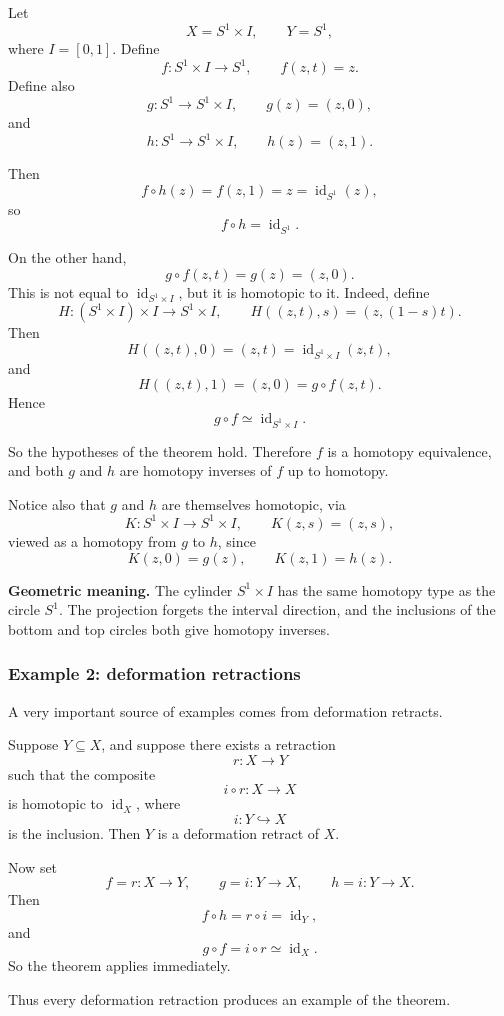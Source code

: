 \documentclass[12pt,a4paper]{article}
\theoremstyle{notespace}
\begin{document}
Let
\[
X=S^1\times I,
\qquad
Y=S^1,
\]
where \(I=[0,1]\). Define
\[
f:S^1\times I\to S^1,
\qquad
f(z,t)=z.
\]
Define also
\[
g:S^1\to S^1\times I,
\qquad
g(z)=(z,0),
\]
and
\[
h:S^1\to S^1\times I,
\qquad
h(z)=(z,1).
\]

Then
\[
f\circ h(z)=f(z,1)=z=\operatorname{id}_{S^1}(z),
\]
so
\[
f\circ h=\operatorname{id}_{S^1}.
\]

On the other hand,
\[
g\circ f(z,t)=g(z)=(z,0).
\]
This is not equal to \(\operatorname{id}_{S^1\times I}\), but it is homotopic to it. Indeed, define
\[
H:(S^1\times I)\times I\to S^1\times I,
\qquad
H((z,t),s)=(z,(1-s)t).
\]
Then
\[
H((z,t),0)=(z,t)=\operatorname{id}_{S^1\times I}(z,t),
\]
and
\[
H((z,t),1)=(z,0)=g\circ f(z,t).
\]
Hence
\[
g\circ f \simeq \operatorname{id}_{S^1\times I}.
\]

So the hypotheses of the theorem hold. Therefore \(f\) is a homotopy equivalence, and both \(g\) and \(h\) are homotopy inverses of \(f\) up to homotopy.

Notice also that \(g\) and \(h\) are themselves homotopic, via
\[
K:S^1\times I\to S^1\times I,
\qquad
K(z,s)=(z,s),
\]
viewed as a homotopy from \(g\) to \(h\), since
\[
K(z,0)=g(z),
\qquad
K(z,1)=h(z).
\]

\bigskip

\textbf{Geometric meaning.}
The cylinder \(S^1\times I\) has the same homotopy type as the circle \(S^1\). The projection forgets the interval direction, and the inclusions of the bottom and top circles both give homotopy inverses.

\subsubsection{Example 2: deformation retractions}

A very important source of examples comes from deformation retracts.

Suppose \(Y\subseteq X\), and suppose there exists a retraction
\[
r:X\to Y
\]
such that the composite
\[
i\circ r:X\to X
\]
is homotopic to \(\operatorname{id}_X\), where
\[
i:Y\hookrightarrow X
\]
is the inclusion. Then \(Y\) is a deformation retract of \(X\).

Now set
\[
f=r:X\to Y,
\qquad
g=i:Y\to X,
\qquad
h=i:Y\to X.
\]
Then
\[
f\circ h=r\circ i=\operatorname{id}_Y,
\]
and
\[
g\circ f=i\circ r \simeq \operatorname{id}_X.
\]
So the theorem applies immediately.

Thus every deformation retraction produces an example of the theorem.
\end{document}
